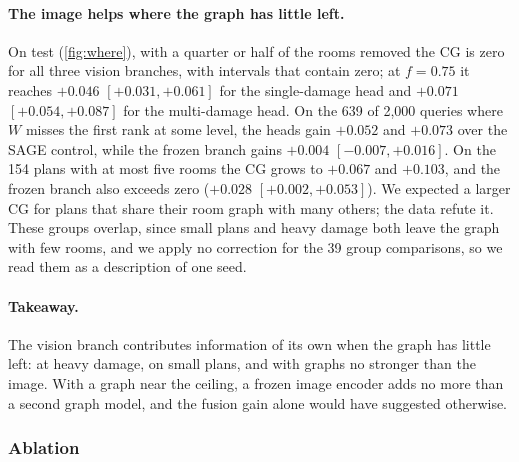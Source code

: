 \paragraph{The image helps where the graph has little left.}
On test (\cref{fig:where}), with a quarter or half of the rooms removed the CG is zero for all three vision branches, with intervals that contain zero; at $f=0.75$ it reaches $+0.046$ $[+0.031, +0.061]$ for the single-damage head and $+0.071$ $[+0.054, +0.087]$ for the multi-damage head.
On the 639 of 2{,}000 queries where $W$ misses the first rank at some level, the heads gain $+0.052$ and $+0.073$ over the SAGE control, while the frozen branch gains $+0.004$ $[-0.007, +0.016]$.
On the 154 plans with at most five rooms the CG grows to $+0.067$ and $+0.103$, and the frozen branch also exceeds zero ($+0.028$ $[+0.002, +0.053]$).
We expected a larger CG for plans that share their room graph with many others; the data refute it.
These groups overlap, since small plans and heavy damage both leave the graph with few rooms, and we apply no correction for the 39 group comparisons, so we read them as a description of one seed.

\paragraph{Takeaway.}
The vision branch contributes information of its own when the graph has little left: at heavy damage, on small plans, and with graphs no stronger than the image.
With a graph near the ceiling, a frozen image encoder adds no more than a second graph model, and the fusion gain alone would have suggested otherwise.

\subsubsection{Ablation}
\label{sec:ablation}

